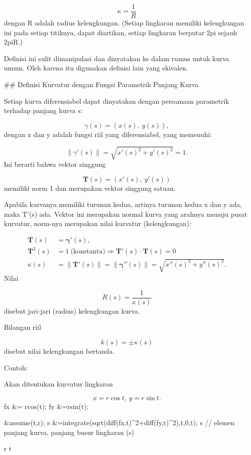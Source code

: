 \documentclass{article}
\begin{document}
$$\kappa =\frac {1}{R}$$dengan R adalah radius kelengkungan. (Setiap lingkaran memiliki
kelengkungan ini pada setiap titiknya, dapat diartikan, setiap
lingkaran berputar 2pi sejauh 2piR.)


Definisi ini sulit dimanipulasi dan dinyatakan ke dalam rumus untuk
kurva umum. Oleh karena itu digunakan definisi lain yang ekivalen.


## Definisi Kurvatur dengan Fungsi Parametrik Panjang Kurva



Setiap kurva diferensiabel dapat dinyatakan dengan persamaan
parametrik terhadap panjang kurva s:


$$\gamma(s) = (x(s),\ y(s)),$$dengan x dan y adalah fungsi riil yang diferensiabel, yang memenuhi:


$$\|\gamma'(s)\|=\sqrt{x'(s)^2+y'(s)^2}=1.$$Ini berarti bahwa vektor singgung


$$\mathbf{T}(s)=(x'(s),\ y'(s))$$memiliki norm 1 dan merupakan vektor singgung satuan.


Apabila kurvanya memiliki turunan kedua, artinya turunan kedua x dan y
ada, maka T'(s) ada. Vektor ini merupakan normal kurva yang arahnya
menuju pusat kurvatur, norm-nya merupakan nilai kurvatur
(kelengkungan):


$$ \begin{aligned}\mathbf{T}(s) &= \mathbf{\gamma}'(s),\\ \mathbf{T}^{2}(s) &=1\ \text{(konstanta)}\Rightarrow \mathbf{T}'(s)\cdot \mathbf{T}(s)=0\\ \kappa(s) &=\|\mathbf {T}'(s)\|= \|\mathbf{\gamma}''(s)\|=\sqrt{x''(s)^{2}+y''(s)^{2}}.\end{aligned}$$Nilai


$$R(s)=\frac{1}{\kappa(s)}$$disebut jari-jari (radius) kelengkungan kurva.


Bilangan riil


$$ k(s) = \pm\kappa(s)$$disebut nilai kelengkungan bertanda.


Contoh:


Akan ditentukan kurvatur lingkaran


$$x=r\cos t,\ y= r\sin t.$$\>fx &= r\*cos(t); fy &=r\*sin(t);

\>&assume(t,r); s &=integrate(sqrt(diff(fx,t)^2+diff(fy,t)^2),t,0,t); s // elemen panjang kurva, panjang busur lingkaran (s)


    
                                     r t
    
\end{document}
